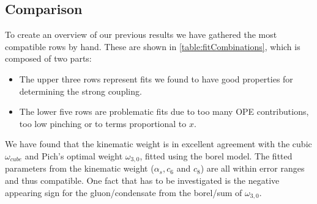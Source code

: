 \documentclass[../../index.tex]{subfiles}
\begin{document}
\subsection{Comparison}
To create an overview of our previous results we have gathered the most
compatible rows by hand. These are shown in \cref{table:fitCombinations}, which
is composed of two parts:
\begin{itemize}
\item The upper three rows represent fits we found to have good properties for
  determining the strong coupling.
\item The lower five rows are problematic fits due to too many OPE
  contributions, too low pinching or to terms proportional to $x$.
\end{itemize}
\begin{table}
  \centering {}
  \caption{Table of the best fits (selected by $\chi^2/dof$ and compatibility of
    the fitting values) for each weight including at least the strong coupling
    $\alpha_s(m_\tau^2)$ as a fitting variable. All fits have been performed
    using \textsc{fopt}, except weights marked with a star $\omega^*$, which
    have been fitted using the \textit{Borel sum}.}
  \label{table:fitCombinations}
\end{table}
We have found that the kinematic weight is in excellent agreement with the cubic
$\omega_{cube}$ and Pich's optimal weight $\omega_{3,0}$, fitted using the borel
model. The fitted parameters from the kinematic weight ($\alpha_s, c_6$ and
$c_8$) are all within error ranges and thus compatible. One fact that has to be
investigated is the negative appearing sign for the gluon\-/condensate from the
borel\-/sum of $\omega_{3,0}$.
\end{document}
